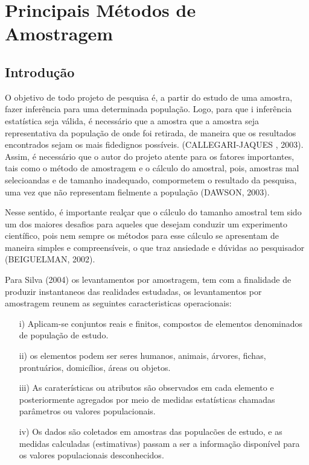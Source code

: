 \chapter{Principais Métodos de Amostragem}

\section{Introdução}

O objetivo de todo projeto de pesquisa é, a partir do estudo de uma amostra, fazer inferência para uma determinada população. Logo, para que i inferência estatística seja válida, é necessário que a amostra que a amostra seja representativa da população de onde foi retirada, de maneira que os resultados encontrados sejam os mais fidedignos possíveis. (CALLEGARI-JAQUES , 2003). Assim, é necessário que o autor do projeto atente para os fatores importantes, tais como o método de amostragem e o cálculo do amostral, pois, amostras mal selecioandas e de tamanho inadequado, compormetem o resultado da pesquisa, uma vez que não representam fielmente a população (DAWSON, 2003).
\vskip0.3cm

Nesse sentido, é importante realçar que o cálculo do tamanho amostral
tem sido um dos maiores desafios para aqueles que desejam conduzir um experimento científico, pois nem sempre os métodos para esse cálculo se apresentam de maneira simples e compreensíveis, o que traz ansiedade e dúvidas ao pesquisador (BEIGUELMAN, 2002).
\vskip0.3cm

Para Silva (2004) os levantamentos por amostragem, tem com a
finalidade de produzir instantaneos das realidades estudadas, os
levantamentos por amostragem reunem as seguintes caracteristicas
operacionais:

\begin{enumerate}
    \item[{i})] Aplicam-se conjuntos reais e finitos, compostos de
    elementos denominados de população de estudo.
    \item[{ii})] os elementos podem ser seres humanos, animais, árvores,
    fichas, prontuários, domicílios, áreas ou objetos.
    \item[{iii})] As caraterísticas ou atributos são observados em cada
    elemento e posteriormente agregados por meio de medidas
    estatísticas chamadas parâmetros ou valores populacionais.
\vskip0.3cm
    \item[{iv})] Os dados são coletados em amostras das populacões de
    estudo, e as medidas calculadas (estimativas) passam a ser a
    informação disponível para os valores populacionais
    desconhecidos.
\end{enumerate}


